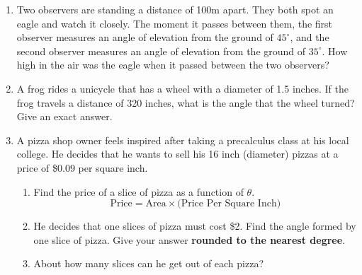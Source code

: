 \documentclass[11pt]{article}
\begin{document}
\begin{enumerate}

\item Two observers are standing a distance of 100m apart.  They both spot an eagle and watch it closely.  The moment it passes between them, the first observer measures an angle of elevation from the ground of $45^\circ$, and the second observer measures an angle of elevation from the ground of $35^\circ.$  How high in the air was the eagle when it passed between the two observers?\vfill


\newpage

\item A frog rides a unicycle that has a wheel with a diameter of 1.5 inches.  If the frog travels a distance of 320 inches, what is the angle that the wheel turned?  Give an exact answer.\vfill





\item A pizza shop owner feels inspired after taking a precalculus class at his local college.  He decides that he wants to sell his 16 inch (diameter) pizzas at a price of \$0.09 per square inch.
\begin{enumerate}
\item Find the price of a slice of pizza as a function of $\theta$.
$$\text{Price}=\text{Area}\times \text{(Price Per Square Inch)}$$\vfill
\item He decides that one slices of pizza must cost \$2.  Find the angle formed by one slice of pizza.  Give your answer \textbf{rounded to the nearest degree}.\vfill
\item About how many slices can he get out of each pizza?\vfill


\end{enumerate}
\end{enumerate}
\end{document}
